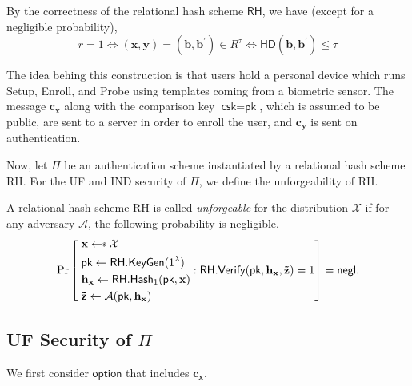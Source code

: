 By the correctness of the relational hash scheme $\textsf{RH}$, we have (except for a negligible probability),
\[
	r = 1 \Leftrightarrow (\mathbf{x}, \mathbf{y}) = (\mathbf{b}, \mathbf{b}^\prime) \in R^\tau \Leftrightarrow \textsf{HD}(\mathbf{b}, \mathbf{b}^\prime) \leq \tau
\]

The idea behing this construction is that users hold a personal device which runs \textsf{Setup}, \textsf{Enroll}, and \textsf{Probe} using templates coming from a biometric sensor. The message $\mathbf{c_x}$ along with the comparison key $\textsf{csk} = \textsf{pk}$, which is assumed to be public, are sent to a server in order to enroll the user, and $\mathbf{c_y}$ is sent on authentication.


Now, let $\Pi$ be an authentication scheme instantiated by a relational hash scheme \textsf{RH}. For the UF and IND security of $\Pi$, we define the unforgeability \cite{cryptoeprint:2014/394} of \textsf{RH}.

\begin{definition}[Unforgeability]

A relational hash scheme \textsf{RH} is called \emph{unforgeable} for the distribution $\mathcal{X}$ if for any adversary $\mathcal{A}$, the following probability is negligible.
\[
	\Pr \left [
		\begin{aligned} 
			 &\; \mathbf{x} \getsdollar \mathcal{X} \\
			 &\; \textsf{pk} \gets \textsf{RH.KeyGen}(1^\lambda) \\
			 &\; \mathbf{h_x} \gets \textsf{RH.Hash}_1(\textsf{pk}, \mathbf{x}) \\
			 &\; \mathbf{\tilde{z}} \gets \mathcal{A}(\textsf{pk}, \mathbf{h_x})
		\end{aligned} :
		\textsf{RH.Verify}(\textsf{pk}, \mathbf{h_x}, \mathbf{\tilde{z}}) = 1
		\right ] = \negl.
\]

\end{definition}



\subsection{UF Security of $\Pi$}
\label{sec:security_analysis:rh:uf}

We first consider $\textsf{option}$ that includes $\mathbf{c_x}$.


